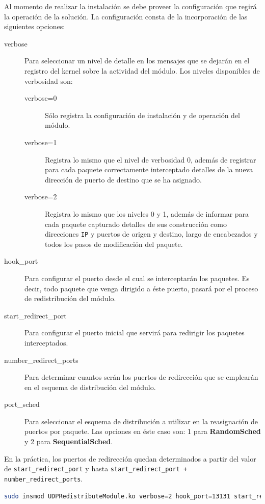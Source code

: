 Al momento de realizar la instalación se debe proveer la configuración que regirá la operación de la solución. La configuración consta de la incorporación de las siguientes opciones:

\begin{description}
\item[verbose] Para seleccionar un nivel de detalle en los mensajes que se dejarán en el registro del kernel sobre la actividad del módulo. Los niveles disponibles de verbosidad son:
\begin{description}
\item[verbose=0] Sólo registra la configuración de instalación y de operación del módulo.
\item[verbose=1] Registra lo mismo que el nivel de verbosidad 0, además de registrar para cada paquete correctamente interceptado detalles de la nueva dirección de puerto de destino que se ha asignado.
\item[verbose=2] Registra lo mismo que los niveles 0 y 1, además de informar para cada paquete capturado detalles de sus construcción como direcciones \verb=IP= y puertos de origen y destino, largo de encabezados y todos los pasos de modificación del paquete.
\end{description}
\item[hook\_port] Para configurar el puerto desde el cual se interceptarán los paquetes. Es decir, todo paquete que venga dirigido a éste puerto, pasará por el proceso de redistribución del módulo.
\item[start\_redirect\_port] Para configurar el puerto inicial que servirá para redirigir los paquetes interceptados.
\item[number\_redirect\_ports] Para determinar cuantos serán los puertos de redirección que se emplearán en el esquema de distribución del módulo.
\item[port\_sched] Para seleccionar el esquema de distribución a utilizar en la reasignación de puertos por paquete. Las opciones en éste caso son: 1 para \textbf{RandomSched} y 2 para \textbf{SequentialSched}.
\end{description}

En la práctica, los puertos de redirección quedan determinados a partir del valor de \verb=start_redirect_port= y hasta \verb=start_redirect_port + number_redirect_ports=.

\begin{lstlisting}[language=Bash,	breaklines=true,frame=single,backgroundcolor=\color{mygray},caption=Ejemplo de instalación de la solución, captionpos=b]
sudo insmod UDPRedistributeModule.ko verbose=2 hook_port=13131 start_redirect_port=1820 number_redirect_ports=4 port_sched={1,2}
\end{lstlisting}


